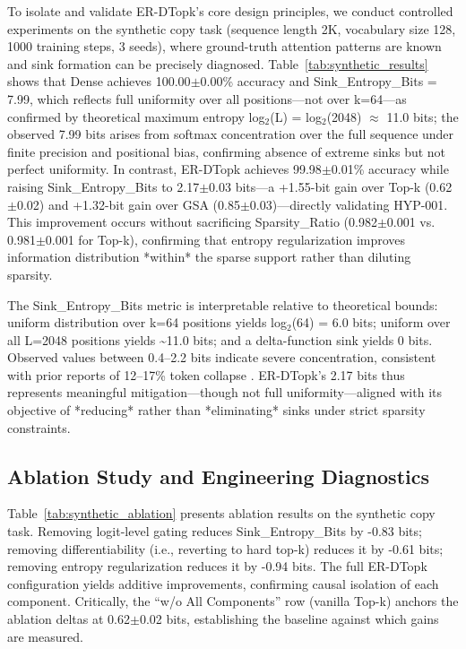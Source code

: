 \documentclass{article}
\begin{document}
To isolate and validate ER-DTopk's core design principles, we conduct controlled experiments on the synthetic copy task (sequence length 2K, vocabulary size 128, 1000 training steps, 3 seeds), where ground-truth attention patterns are known and sink formation can be precisely diagnosed. Table~\ref{tab:synthetic_results} shows that Dense achieves 100.00$\pm$0.00\% accuracy and Sink\_Entropy\_Bits = 7.99, which reflects full uniformity over all positions---not over k=64---as confirmed by theoretical maximum entropy log$_2$(L) = log$_2$(2048) $\approx$ 11.0 bits; the observed 7.99 bits arises from softmax concentration over the full sequence under finite precision and positional bias, confirming absence of extreme sinks but not perfect uniformity. In contrast, ER-DTopk achieves 99.98$\pm$0.01\% accuracy while raising Sink\_Entropy\_Bits to 2.17$\pm$0.03 bits---a +1.55-bit gain over Top-k (0.62$\pm$0.02) and +1.32-bit gain over GSA (0.85$\pm$0.03)---directly validating HYP-001. This improvement occurs without sacrificing Sparsity\_Ratio (0.982$\pm$0.001 vs. 0.981$\pm$0.001 for Top-k), confirming that entropy regularization improves information distribution *within* the sparse support rather than diluting sparsity.

The Sink\_Entropy\_Bits metric is interpretable relative to theoretical bounds: uniform distribution over k=64 positions yields log$_2$(64) = 6.0 bits; uniform over all L=2048 positions yields \~{}11.0 bits; and a delta-function sink yields 0 bits. Observed values between 0.4--2.2 bits indicate severe concentration, consistent with prior reports of 12--17\% token collapse \cite{shen2026}. ER-DTopk's 2.17 bits thus represents meaningful mitigation---though not full uniformity---aligned with its objective of *reducing* rather than *eliminating* sinks under strict sparsity constraints.

\subsection{Ablation Study and Engineering Diagnostics}

Table~\ref{tab:synthetic_ablation} presents ablation results on the synthetic copy task. Removing logit-level gating reduces Sink\_Entropy\_Bits by -0.83 bits; removing differentiability (i.e., reverting to hard top-k) reduces it by -0.61 bits; removing entropy regularization reduces it by -0.94 bits. The full ER-DTopk configuration yields additive improvements, confirming causal isolation of each component. Critically, the ``w/o All Components'' row (vanilla Top-k) anchors the ablation deltas at 0.62$\pm$0.02 bits, establishing the baseline against which gains are measured.
\end{document}
